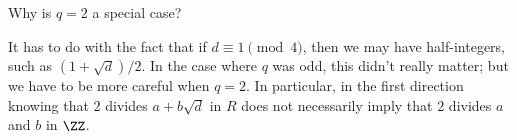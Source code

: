 \begin{question}
Why is $q = 2$ a special case?
\end{question}

\begin{ans}
It has to do with the fact that if $d \equiv 1 \pmod{4}$, then we may have half-integers, such as $(1 + \sqrt{d})/2$. In the case where $q$ was odd, this didn't really matter; but we have to be more careful when $q = 2$. In particular, in the first direction knowing that $2$ divides $a + b\sqrt{d}$ in $R$ does not necessarily imply that $2$ divides $a$ and $b$ in $\ZZ$. 
\end{ans}




